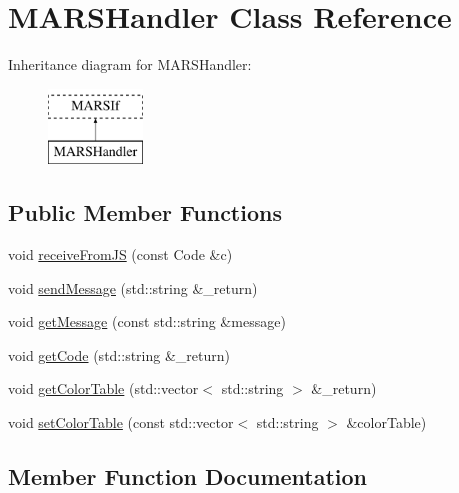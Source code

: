 \hypertarget{classMARSHandler}{}\section{M\+A\+R\+S\+Handler Class Reference}
\label{classMARSHandler}
Inheritance diagram for M\+A\+R\+S\+Handler\+:\begin{figure}[H]
\begin{center}
\leavevmode
\includegraphics[height=2.000000cm]{classMARSHandler}
\end{center}
\end{figure}
\subsection*{Public Member Functions}
\begin{DoxyCompactItemize}
\item 
void \hyperlink{classMARSHandler_aad361446a8dab85013f8eea681c95663}{receive\+From\+JS} (const Code \&c)
\item 
void \hyperlink{classMARSHandler_a59f960d2b59109d22eb25911284c167c}{send\+Message} (std\+::string \&\+\_\+return)
\item 
void \hyperlink{classMARSHandler_a87dbdc238b461bf59eb53e0a881aa34e}{get\+Message} (const std\+::string \&message)
\item 
void \hyperlink{classMARSHandler_a051b0a327d012bebb315083e5faf80e4}{get\+Code} (std\+::string \&\+\_\+return)
\item 
void \hyperlink{classMARSHandler_a9cc24026adecda320622810448188173}{get\+Color\+Table} (std\+::vector$<$ std\+::string $>$ \&\+\_\+return)
\item 
void \hyperlink{classMARSHandler_ac332bb9228000d1220fe80366fbccea4}{set\+Color\+Table} (const std\+::vector$<$ std\+::string $>$ \&color\+Table)
\end{DoxyCompactItemize}


\subsection{Member Function Documentation}
\mbox{\label{classMARSHandler_a051b0a327d012bebb315083e5faf80e4}} 
